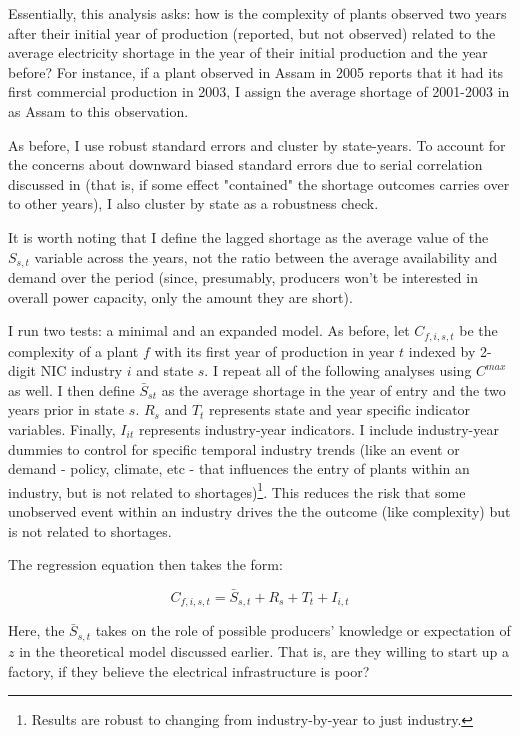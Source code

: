\documentclass[11pt]{article}
\begin{document}
Essentially, this analysis asks: how is the complexity of plants observed two years after their initial year of production (reported, but not observed) related to the average electricity shortage in the year of their initial production and the year before? For instance, if a plant observed in Assam in 2005 reports that it had its first commercial production in 2003, I assign the average shortage of 2001-2003 in as Assam to this observation.

As before, I use robust standard errors and cluster by state-years. To account for the concerns about downward biased standard errors due to serial correlation discussed in \cite{bertrand_how_2004} (that is, if some effect "contained" the shortage outcomes carries over to other years), I also cluster by state as a robustness check.

It is worth noting that I define the lagged shortage as the average value of the $S_{s,t}$ variable across the years, not the ratio between the average availability and demand over the period (since, presumably, producers won't be interested in overall power capacity, only the amount they are short).

I run two tests: a minimal and an expanded model. As before, let $C_{f,i,s,t}$ be the complexity of a plant $f$ with its first year of production in year $t$ indexed by 2-digit NIC industry $i$ and state $s$. I repeat all of the following analyses using $C^{max}$ as well. I then define $\bar{S}_{st}$ as the average shortage in the year of entry and the two years prior in state $s$. $R_{s}$ and $T_{t}$ represents state and year specific indicator variables. Finally, $I_{it}$ represents industry-year indicators. I include industry-year dummies to control for specific temporal industry trends (like an event or demand - policy, climate, etc - that influences the entry of plants within an industry, but is not related to shortages)\footnote{Results are robust to changing from industry-by-year to just industry.}. This reduces the risk that some unobserved event within an industry drives the the outcome (like complexity) but is not related to shortages.

The regression equation then takes the form:

\begin{equation}
\label{eqn:interact}
	C_{f,i,s,t} = \bar{S}_{s,t} + R_{s} + T_{t} + I_{i,t} 
\end{equation}

Here, the $\bar{S}_{s,t}$ takes on the role of possible producers' knowledge or expectation of $z$ in the theoretical model discussed earlier. That is, are they willing to start up a factory, if they believe the electrical infrastructure is poor?
 
\end{document}
